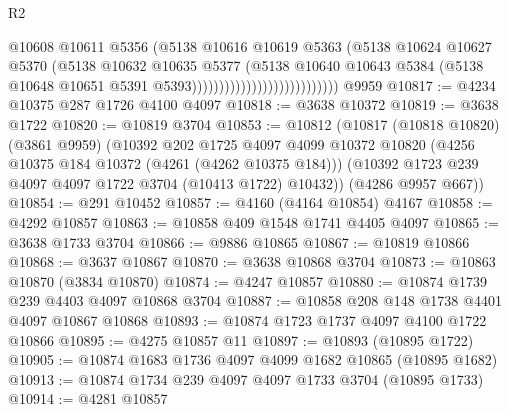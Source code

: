 \begin{lexlean}{R2}
\begin{coremodule}
                                                @10608
                                                @10611
                                                @5356
                                                (@5138
                                                  @10616
                                                  @10619
                                                  @5363
                                                  (@5138
                                                    @10624
                                                    @10627
                                                    @5370
                                                    (@5138
                                                      @10632
                                                      @10635
                                                      @5377
                                                      (@5138
                                                        @10640
                                                        @10643
                                                        @5384
                                                        (@5138
                                                          @10648
                                                          @10651
                                                          @5391
                                                          @5393)))))))))))))))))))))))))))
    @9959
@10817 := @4234 @10375 @287 @1726 @4100 @4097
@10818 := @3638 @10372
@10819 := @3638 @1722
@10820 := @10819 @3704
@10853 := @10812
    (@10817
      (@10818 @10820)
      (@3861 @9959)
      (@10392
        @202
        @1725
        @4097
        @4099
        @10372
        @10820
        (@4256 @10375 @184 @10372 (@4261 (@4262 @10375 @184)))
        (@10392 @1723 @239 @4097 @4097 @1722 @3704 (@10413 @1722) @10432))
      (@4286 @9957 @667))
@10854 := @291 @10452
@10857 := @4160 (@4164 @10854) @4167
@10858 := @4292 @10857
@10863 := @10858 @409 @1548 @1741 @4405 @4097
@10865 := @3638 @1733 @3704
@10866 := @9886 @10865
@10867 := @10819 @10866
@10868 := @3637 @10867
@10870 := @3638 @10868 @3704
@10873 := @10863 @10870 (@3834 @10870)
@10874 := @4247 @10857
@10880 := @10874 @1739 @239 @4403 @4097 @10868 @3704
@10887 := @10858 @208 @148 @1738 @4401 @4097 @10867 @10868
@10893 := @10874 @1723 @1737 @4097 @4100 @1722 @10866
@10895 := @4275 @10857 @11
@10897 := @10893 (@10895 @1722)
@10905 := @10874 @1683 @1736 @4097 @4099 @1682 @10865 (@10895 @1682)
@10913 := @10874 @1734 @239 @4097 @4097 @1733 @3704 (@10895 @1733)
@10914 := @4281 @10857

\end{coremodule}
\end{lexlean}
